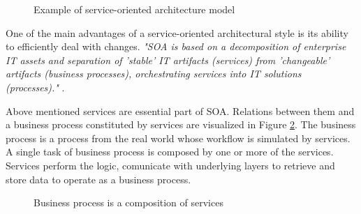 \begin{figure}[htp] 
\caption{Example of service-oriented architecture model}
\label{fig:soa-architecture}
\end{figure}  

One of the main advantages of a service-oriented architectural style is its ability to efficiently deal with changes. \textit{"SOA is based on a decomposition of enterprise IT assets and separation of 'stable' IT artifacts (services) from 'changeable' artifacts (business processes), orchestrating services into IT solutions (processes)."} \cite{website:versioning-in-soa}. %

Above mentioned services are essential part of SOA. Relations between them and a business process constituted by services are visualized in Figure \ref{fig:business-process-services}. The business process is a process from the real world whose workflow is simulated by services. A single task of business process is composed by one or more of the services. Services perform the logic, comunicate with underlying layers to retrieve and store data to operate as a business process.

\begin{figure}[htp] 
\caption{Business process is a composition of services}
\label{fig:business-process-services}
\end{figure} 

